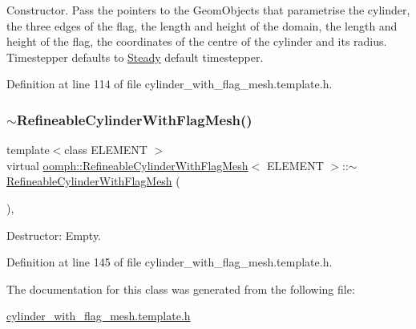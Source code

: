 Constructor. Pass the pointers to the Geom\+Objects that parametrise the cylinder, the three edges of the flag, the length and height of the domain, the length and height of the flag, the coordinates of the centre of the cylinder and its radius. Timestepper defaults to \hyperlink{classoomph_1_1Steady}{Steady} default timestepper. 



Definition at line 114 of file cylinder\+\_\+with\+\_\+flag\+\_\+mesh.\+template.\+h.

\mbox{\label{classoomph_1_1RefineableCylinderWithFlagMesh_a61744e809a7b7c74288273dfbc448751}} 
\subsubsection{\texorpdfstring{$\sim$\+Refineable\+Cylinder\+With\+Flag\+Mesh()}{~RefineableCylinderWithFlagMesh()}}
{\footnotesize\ttfamily template$<$class E\+L\+E\+M\+E\+NT $>$ \\
virtual \hyperlink{classoomph_1_1RefineableCylinderWithFlagMesh}{oomph\+::\+Refineable\+Cylinder\+With\+Flag\+Mesh}$<$ E\+L\+E\+M\+E\+NT $>$\+::$\sim$\hyperlink{classoomph_1_1RefineableCylinderWithFlagMesh}{Refineable\+Cylinder\+With\+Flag\+Mesh} (\begin{DoxyParamCaption}{ }\end{DoxyParamCaption})\hspace{0.3cm}{\ttfamily [inline]}, {\ttfamily [virtual]}}



Destructor\+: Empty. 



Definition at line 145 of file cylinder\+\_\+with\+\_\+flag\+\_\+mesh.\+template.\+h.



The documentation for this class was generated from the following file\+:\begin{DoxyCompactItemize}
\item 
\hyperlink{cylinder__with__flag__mesh_8template_8h}{cylinder\+\_\+with\+\_\+flag\+\_\+mesh.\+template.\+h}\end{DoxyCompactItemize}
